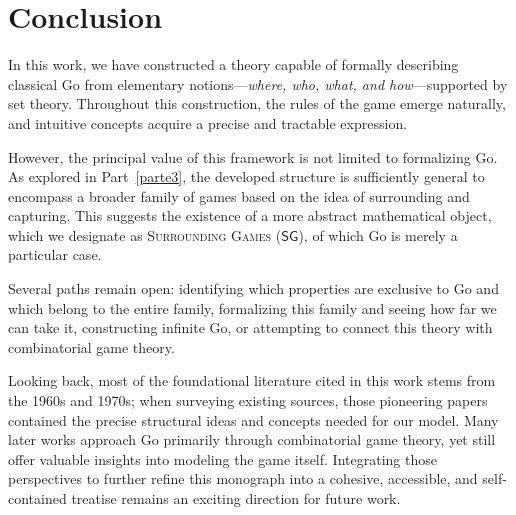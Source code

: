 \section{Conclusion}

In this work, we have constructed a theory capable of formally describing classical Go from elementary notions—\emph{where, who, what, and how}—supported by set theory. Throughout this construction, the rules of the game emerge naturally, and intuitive concepts acquire a precise and tractable expression.

However, the principal value of this framework is not limited to formalizing Go. As explored in Part~\ref{parte3}, the developed structure is sufficiently general to encompass a broader family of games based on the idea of surrounding and capturing. This suggests the existence of a more abstract mathematical object, which we designate as \textsc{Surrounding Games} (\(\mathsf{SG}\)), of which Go is merely a particular case.

Several paths remain open: identifying which properties are exclusive to Go and which belong to the entire family, formalizing this family and seeing how far we can take it, constructing infinite Go, or attempting to connect this theory with combinatorial game theory.

\vfill

Looking back, most of the foundational literature cited in this work stems from the 1960s and 1970s; when surveying existing sources, those pioneering papers contained the precise structural ideas and concepts needed for our model. Many later works approach Go primarily through combinatorial game theory, yet still offer valuable insights into modeling the game itself. Integrating those perspectives to further refine this monograph into a cohesive, accessible, and self-contained treatise remains an exciting direction for future work.